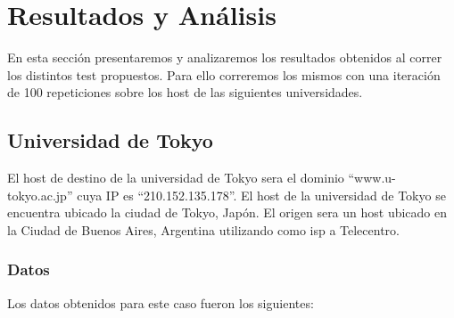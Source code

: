 \section{Resultados y Análisis}
En esta sección presentaremos y analizaremos los resultados obtenidos al correr los distintos test propuestos.
Para ello correremos los mismos con una iteración de 100 repeticiones sobre los host de las siguientes universidades.

\subsection{Universidad de Tokyo}
El host de destino de la universidad de Tokyo sera el dominio ``www.u-tokyo.ac.jp'' cuya IP es ``210.152.135.178''. El host de la universidad de Tokyo se encuentra ubicado la ciudad de Tokyo, Japón. El origen sera un host ubicado en la Ciudad de Buenos Aires, Argentina utilizando como isp a Telecentro.

\subsubsection{Datos}

Los datos obtenidos para este caso fueron los siguientes:

